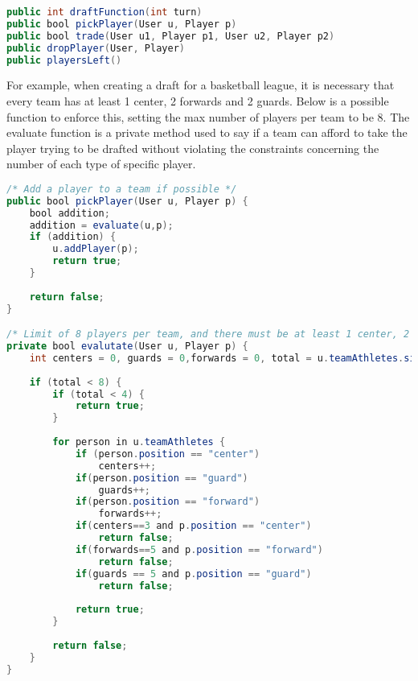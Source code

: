\documentclass[12pt]{report}
\begin{document}
\begin{lstlisting}[language=Java,label=some-code,caption=Action]
public int draftFunction(int turn)
public bool pickPlayer(User u, Player p)
public bool trade(User u1, Player p1, User u2, Player p2)
public dropPlayer(User, Player)
public playersLeft()
\end{lstlisting}

\begin{doublespace}
For example, when creating a draft for a basketball league, it is necessary that every team has at least 1 center, 2 forwards and 2 guards. Below is a possible function to enforce this, setting the max number of players per team to be 8. The evaluate function is a private method used to say if a team can afford to take the player trying to be drafted without violating the constraints concerning the number of each type of specific player.
\end{doublespace}

\begin{lstlisting}[language=Java,label=some-code,caption=Action]
/* Add a player to a team if possible */
public bool pickPlayer(User u, Player p) {
	bool addition;
	addition = evaluate(u,p);
	if (addition) {
		u.addPlayer(p);
		return true;
	}
	
	return false;
}

/* Limit of 8 players per team, and there must be at least 1 center, 2 guards and 2 forwards per team. */
private bool evalutate(User u, Player p) {
	int centers = 0, guards = 0,forwards = 0, total = u.teamAthletes.size();
	
	if (total < 8) {
		if (total < 4) {
			return true;
		}
		
		for person in u.teamAthletes {
			if (person.position == "center")
				centers++;
			if(person.position == "guard")
				guards++;
			if(person.position == "forward")
				forwards++;
			if(centers==3 and p.position == "center")
				return false;
			if(forwards==5 and p.position == "forward")
				return false;
			if(guards == 5 and p.position == "guard")
				return false;
				
			return true;
		}
		
		return false;
	}
}
\end{lstlisting}
\end{document}
